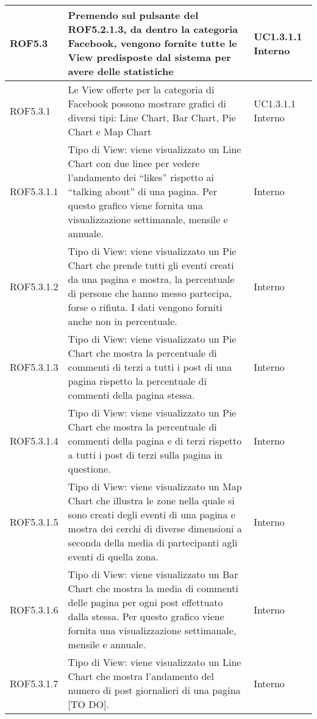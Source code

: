 \begin{center}
\begin{longtable}{| p{2cm} | p{8cm} | p{2cm} |}
		ROF5.3  & Premendo sul pulsante del ROF5.2.1.3, da dentro la categoria Facebook, vengono fornite tutte le View predisposte dal sistema per avere delle statistiche & UC1.3.1.1 \newline Interno \\
		\hline
		ROF5.3.1  & Le View offerte per la categoria di Facebook possono mostrare grafici di diversi tipi: Line Chart, Bar Chart, Pie Chart e Map Chart &  UC1.3.1.1 \newline Interno \\
		\hline
		ROF5.3.1.1  & Tipo di View: viene visualizzato un Line Chart con due linee per vedere l'andamento dei ``likes'' rispetto ai ``talking about'' di una pagina. Per questo grafico viene fornita una visualizzazione settimanale, mensile e annuale.  & Interno \\
		\hline
		ROF5.3.1.2  &  Tipo di View: viene visualizzato un Pie Chart che prende tutti gli eventi creati da una pagina e mostra, la percentuale di persone che hanno messo partecipa, forse o rifiuta. I dati vengono forniti anche non in percentuale. & Interno \\
		\hline
		ROF5.3.1.3  &  Tipo di View: viene visualizzato un Pie Chart che mostra la percentuale di commenti di terzi a tutti i post di una pagina rispetto la percentuale di commenti della pagina stessa. & Interno \\
		\hline
		ROF5.3.1.4  &  Tipo di View: viene visualizzato un Pie Chart che mostra la percentuale di commenti della pagina e di terzi rispetto a tutti i post di terzi sulla pagina in questione. & Interno \\
		\hline
		ROF5.3.1.5  &  Tipo di View: viene visualizzato un Map Chart che illustra le zone nella quale si sono creati degli eventi di una pagina e mostra dei cerchi di diverse dimensioni a seconda della media di partecipanti agli eventi di quella zona. & Interno \\
		\hline
		ROF5.3.1.6  &  Tipo di View: viene visualizzato un Bar Chart che mostra la media di commenti delle pagina per ogni post effettuato dalla stessa. Per questo grafico viene fornita una visualizzazione settimanale, mensile e annuale. & Interno \\
		\hline
		ROF5.3.1.7  &  Tipo di View: viene visualizzato un Line Chart che mostra l’andamento del numero di post giornalieri di una pagina [TO DO]. & Interno \\
		\hline



\end{longtable}
\end{center}
